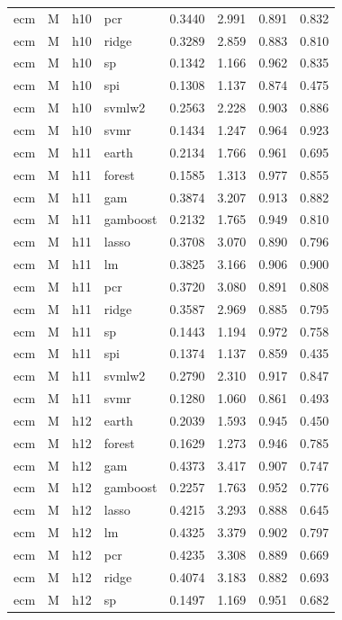 \begin{ThreePartTable}
\begin{longtable}[t]{llclcccc}
ecm & M & h10 & pcr & 0.3440 & 2.991 & 0.891 & 0.832\\
ecm & M & h10 & ridge & 0.3289 & 2.859 & 0.883 & 0.810\\
ecm & M & h10 & sp & 0.1342 & 1.166 & 0.962 & 0.835\\
ecm & M & h10 & spi & 0.1308 & 1.137 & 0.874 & 0.475\\
ecm & M & h10 & svmlw2 & 0.2563 & 2.228 & 0.903 & 0.886\\
ecm & M & h10 & svmr & 0.1434 & 1.247 & 0.964 & 0.923\\
\addlinespace
ecm & M & h11 & earth & 0.2134 & 1.766 & 0.961 & 0.695\\
ecm & M & h11 & forest & 0.1585 & 1.313 & 0.977 & 0.855\\
ecm & M & h11 & gam & 0.3874 & 3.207 & 0.913 & 0.882\\
ecm & M & h11 & gamboost & 0.2132 & 1.765 & 0.949 & 0.810\\
ecm & M & h11 & lasso & 0.3708 & 3.070 & 0.890 & 0.796\\
ecm & M & h11 & lm & 0.3825 & 3.166 & 0.906 & 0.900\\
ecm & M & h11 & pcr & 0.3720 & 3.080 & 0.891 & 0.808\\
ecm & M & h11 & ridge & 0.3587 & 2.969 & 0.885 & 0.795\\
ecm & M & h11 & sp & 0.1443 & 1.194 & 0.972 & 0.758\\
ecm & M & h11 & spi & 0.1374 & 1.137 & 0.859 & 0.435\\
ecm & M & h11 & svmlw2 & 0.2790 & 2.310 & 0.917 & 0.847\\
ecm & M & h11 & svmr & 0.1280 & 1.060 & 0.861 & 0.493\\
\addlinespace
ecm & M & h12 & earth & 0.2039 & 1.593 & 0.945 & 0.450\\
ecm & M & h12 & forest & 0.1629 & 1.273 & 0.946 & 0.785\\
ecm & M & h12 & gam & 0.4373 & 3.417 & 0.907 & 0.747\\
ecm & M & h12 & gamboost & 0.2257 & 1.763 & 0.952 & 0.776\\
ecm & M & h12 & lasso & 0.4215 & 3.293 & 0.888 & 0.645\\
ecm & M & h12 & lm & 0.4325 & 3.379 & 0.902 & 0.797\\
ecm & M & h12 & pcr & 0.4235 & 3.308 & 0.889 & 0.669\\
ecm & M & h12 & ridge & 0.4074 & 3.183 & 0.882 & 0.693\\
ecm & M & h12 & sp & 0.1497 & 1.169 & 0.951 & 0.682\\

\end{longtable}
\end{ThreePartTable}
